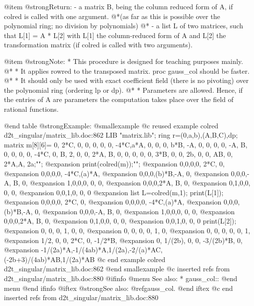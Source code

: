@item @strong{Return:}
- a matrix B, being the column reduced form of A, if colred is
called with one argument.
@*(as far as this is possible over the polynomial ring;
no division by polynomials)
@* - a list L of two matrices, such that L[1] = A * L[2] with L[1]
the column-reduced form of A and L[2] the transformation matrix
(if colred is called with two arguments).

@item @strong{Note:}
* This procedure is designed for teaching purposes mainly.
@* * It applies rowred to the transposed matrix.
proc gauss_col should be faster.
@* * It should only be used with exact coefficient field (there is no
pivoting) over the polynomial ring (ordering lp or dp).
@* * Parameters are allowed. Hence, if the entries of A are parameters
the computation takes place over the field of rational functions.

@end table
@strong{Example:}
@smallexample
@c reused example colred d2t_singular/matrix_lib.doc:862 
LIB "matrix.lib";
ring r=(0,a,b),(A,B,C),dp;
matrix m[8][6]=
0,    2*C, 0,    0,  0,   0,
0,    -4*C,a*A,  0,  0,   0,
b*B,  -A,  0,    0,  0,   0,
-A,   B,   0,    0,  0,   0,
-4*C, 0,   B,    2,  0,   0,
2*A,  B,   0,    0,  0,   0,
0,    3*B, 0,    0,  2b,  0,
0,    AB,  0,    2*A,A,   2a;"";
@expansion{} 
print(colred(m));"";
@expansion{} 0,0,0,0,    2*C, 0,    
@expansion{} 0,0,0,0,    -4*C,(a)*A,
@expansion{} 0,0,0,(b)*B,-A,  0,    
@expansion{} 0,0,0,-A,   B,   0,    
@expansion{} 1,0,0,0,    0,   0,    
@expansion{} 0,0,0,2*A,  B,   0,    
@expansion{} 0,1,0,0,    0,   0,    
@expansion{} 0,0,1,0,    0,   0     
@expansion{} 
list L=colred(m,1);
print(L[1]);
@expansion{} 0,0,0,0,    2*C, 0,    
@expansion{} 0,0,0,0,    -4*C,(a)*A,
@expansion{} 0,0,0,(b)*B,-A,  0,    
@expansion{} 0,0,0,-A,   B,   0,    
@expansion{} 1,0,0,0,    0,   0,    
@expansion{} 0,0,0,2*A,  B,   0,    
@expansion{} 0,1,0,0,    0,   0,    
@expansion{} 0,0,1,0,    0,   0     
print(L[2]);
@expansion{} 0,        0,         0,     1,        0,               0,       
@expansion{} 0,        0,         0,     0,        1,               0,       
@expansion{} 0,        0,         0,     0,        0,               1,       
@expansion{} 1/2,      0,         0,     2*C,      0,               -1/2*B,  
@expansion{} 0,        1/(2b),    0,     0,        -3/(2b)*B,       0,       
@expansion{} -1/(2a)*A,-1/(4ab)*A,1/(2a),-2/(a)*AC,(-2b+3)/(4ab)*AB,1/(2a)*AB
@c end example colred d2t_singular/matrix_lib.doc:862
@end smallexample
@c inserted refs from d2t_singular/matrix_lib.doc:880
@ifinfo
@menu
See also:
* gauss_col::
@end menu
@end ifinfo
@iftex
@strong{See also:}
@ref{gauss_col}.
@end iftex
@c end inserted refs from d2t_singular/matrix_lib.doc:880


